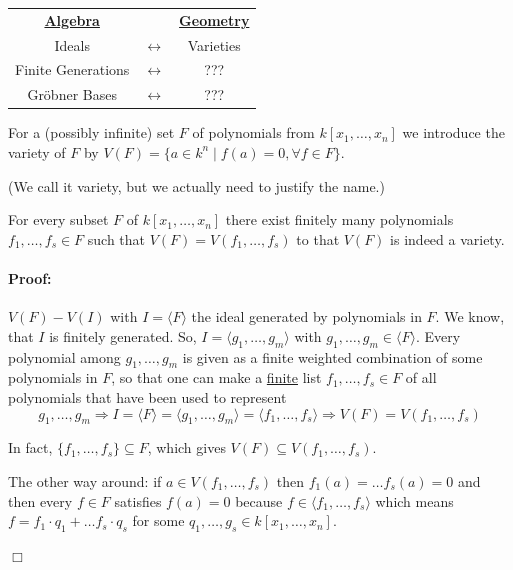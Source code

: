 \begin{center}
\begin{tabular}{c cc}

    \textbf{\underline{Algebra}} & & \textbf{\underline{Geometry}} \\ 

    Ideals & $\longleftrightarrow$ & Varieties \\ 
    Finite Generations & $\longleftrightarrow$ & ???  \\
    Gröbner Bases & $\longleftrightarrow$ & ??? \\
\end{tabular}
\end{center}
\clearpage
\begin{definition}[title = Definition 2.4.8]
    For a (possibly infinite) set $F$ of polynomials from $k[x_1, \dots, x_n]$ we introduce the variety of $F$ by $V(F) = \{a \in k^n \mid f(a) = 0, \forall f \in F\}$.  
\end{definition}
  (We call it variety, but we actually need to justify the name.) 

\begin{proposition}[title = Proposition 2.4.9]
    For every subset $F$ of $k[x_1, \dots, x_n]$ there exist finitely many polynomials $f_1, \ldots, f_s \in F$ such that $V(F) = V(f_1, \ldots, f_s)$ to that $V(F)$ is indeed a variety.


    \paragraph{Proof:}  $V(F) - V(I)$ with $I = \langle F \rangle $ the ideal generated by polynomials in $F$. We know, that $I$ is finitely generated. So, $I = \langle  g_1, \ldots, g_m \rangle $ with $g_1, \ldots, g_m \in \langle F \rangle $. 
    Every polynomial among $g_1, \ldots, g_m$ is given as a finite weighted combination of some polynomials in $F$, so that one can make a \underline{finite} list $f_1, \ldots, f_s \in F$ of all polynomials that have been used to 
    represent \[g_1, \ldots, g_m \Rightarrow I = \langle F \rangle = \langle g_1, \ldots, g_m \rangle  = \langle f_1, \ldots, f_s \rangle \Rightarrow V(F) = V(f_1, \ldots, f_s)\]

    In fact, $\{f_1, \ldots, f_s\} \subseteq F$, which gives $V(F) \subseteq V(f_1, \ldots, f_s)$. 
    
    The other way around: if $a \in V(f_1, \ldots, f_s)$ then $f_1(a) = \ldots f_s(a) = 0$ and then every $f \in F$ satisfies 
    $f(a) = 0$ because $f \in \langle f_1, \ldots, f_s \rangle $ which means $f = f_1 \cdot q_1 + \ldots  f_s \cdot q_s$ for some $q_1, \ldots, g_s \in k[x_1, \dots, x_n]$. 


    \begin{flushright}
      $\Box $
    \end{flushright}
\end{proposition}


